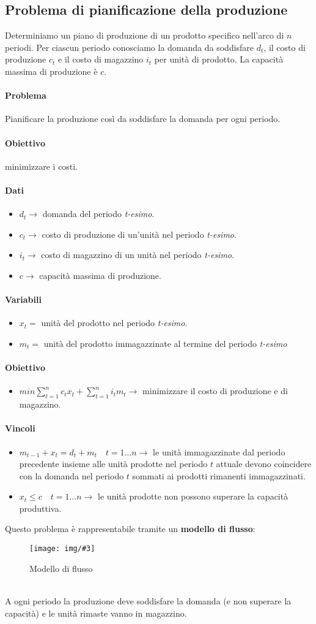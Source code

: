 \documentclass[12pt, twoside, letterpaper]{article}
\newcommand{\img}[3] {
	\begin{figure}[h]
		\caption{#1}
		\centering
		\texttt{[image: img/\#3]}\\
	\end{figure}
}
\newcommand{\problemai}[5]{
	#1
	\begin{dati}
		\paragraph{Dati} 
			\begin{itemize}
				#2
			\end{itemize}
	\end{dati}
	\begin{variabili}
		\paragraph{Variabili} 
			\begin{itemize}
				#3
			\end{itemize}
	\end{variabili}
	\begin{obiettivo}
		\paragraph{Obiettivo} 
			\begin{itemize}
				#4
			\end{itemize}
	\end{obiettivo}
	\begin{vincoli}
		\paragraph{Vincoli}
			\begin{itemize}
				#5
			\end{itemize}
	\end{vincoli}
}
\begin{document}
		\subsection{Problema di pianificazione della produzione}
			\problemai{
				Determiniamo un piano di produzione di un prodotto specifico nell'arco di $n$ periodi. Per ciascun periodo conosciamo la domanda da soddisfare $d_t$, il costo di produzione $c_t$ e il costo di magazzino $i_t$ per unità di prodotto. La capacità massima di produzione è $c$.
				
				\paragraph{Problema} Pianificare la produzione così da soddisfare la domanda per ogni periodo.
				
				\paragraph{Obiettivo} minimizzare i costi.
			}{
				\item $d_t \rightarrow$ domanda del periodo \textit{t-esimo}.
				\item $c_t \rightarrow$ costo di produzione di un'unità nel periodo \textit{t-esimo}.
				\item $i_t \rightarrow$ costo di magazzino di un unità nel periodo \textit{t-esimo}.
				\item $c \rightarrow$ capacità massima di produzione.
			}{
				\item $x_t =$ unità del prodotto nel periodo \textit{t-esimo}.
				\item $m_t =$ unità del prodotto immagazzinate al termine del periodo \textit{t-esimo}
			}{
				\item $min \sum _{t=1}^n c_t x_t + \sum_{t=1}^n i_t m_t \rightarrow$ minimizzare il costo di produzione e di magazzino.
			}{
				\item $m_{t-1} + x_t = d_t + m_t \quad t = 1 \dots n \rightarrow$ le unità immagazzinate dal periodo precedente insieme alle unità prodotte nel periodo $t$ attuale devono coincidere con la domanda nel periodo $t$ sommati ai prodotti rimanenti immagazzinati.
				\item $x_t \leq c \quad t = 1 \dots n \rightarrow$ le unità prodotte non possono superare la capacità produttiva.
			}
			Questo problema è rappresentabile tramite un \textbf{modello di flusso}:
			\img{Modello di flusso}{0.7}{img1.png}
			\\A ogni periodo la produzione deve soddisfare la domanda (e non superare la capacità) e le unità rimaste vanno in magazzino.	
			
\end{document}
